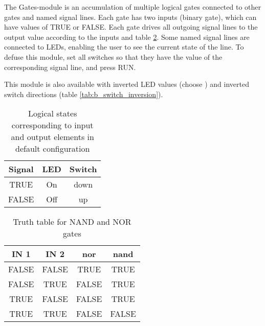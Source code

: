 \documentclass[a4paper]{report}
\author{hephaisto}
\title{\moduleTitle}
\begin{document}




The Gates-module is an accumulation of multiple logical gates connected to other gates and named signal lines.
Each gate has two inputs (binary gate), which can have values of TRUE or FALSE.
Each gate drives all outgoing signal lines to the output value according to the inputs and table \ref{tab:b_truthtable}.
Some named signal lines are connected to LEDs, enabling the user to see the current state of the line.
To defuse this module, set all switches so that they have the value of the corresponding signal line, and press RUN.

This module is also available with inverted LED values (choose \ledInversionNumbers ) and inverted switch directions (table \ref{tab:b_switch_inversion}).


\begin{table}
	\centering
	\begin{tabular}{|ccc|}\hline
		Signal & LED & Switch \\\hline
		TRUE & On & down \\
		FALSE & Off & up \\\hline
	\end{tabular}
	\caption{Logical states corresponding to input and output elements in default configuration}
	\label{tab:b_io_logic}
\end{table}

\begin{table}
	\centering
	\begin{tabular}{|cc|cc|}\hline
		IN 1 & IN 2 & nor & nand \\\hline
		FALSE & FALSE & TRUE & TRUE \\
		FALSE & TRUE & FALSE & TRUE \\
		TRUE & FALSE & FALSE & TRUE \\
		TRUE & TRUE & FALSE & FALSE \\\hline
	\end{tabular}
	\caption{Truth table for NAND and NOR gates}
	\label{tab:b_truthtable}
\end{table}


\end{document}
